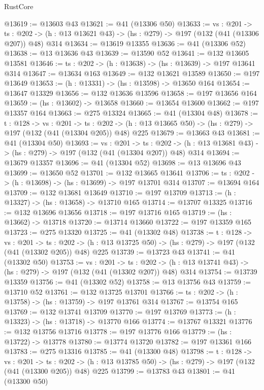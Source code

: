 \begin{lexlean}{RustCore}
\begin{coremodule}
@13619 := @13603 @43
@13621 := @41 (@13306 @50)
@13633 := {vs : @201} ->
  {ts : @202} -> (h : @13 @13621 @43) -> (hs : @279) -> @197 (@132 (@41 (@13306 @207)) @48) @314
@13634 := @13619 @13355
@13636 := @41 (@13306 @52)
@13638 := @13 @13636 @43
@13639 := @13590 @52
@13641 := @132 @13605 @13581
@13646 := {ts : @202} -> (h : @13638) -> (hs : @13639) -> @197 @13641 @314
@13647 := @13634 @163
@13649 := @132 @13621 @13589
@13650 := @197 @13649
@13653 := (h : @13331) -> (hs : @13598) -> @13650 @164
@13654 := @13647 @13329
@13656 := @132 @13636 @13596
@13658 := @197 @13656 @164
@13659 := (hs : @13602) -> @13658
@13660 := @13654 @13600
@13662 := @197 @13357 @164
@13663 := @275 @13324
@13665 := @41 (@13304 @48)
@13678 := {t : @128} ->
  {vs : @201} ->
  {ts : @202} -> (h : @13 @13665 @50) -> (hs : @279) -> @197 (@132 (@41 (@13304 @205)) @48) @225
@13679 := @13663 @43
@13681 := @41 (@13304 @50)
@13693 := {vs : @201} ->
  {ts : @202} -> (h : @13 @13681 @43) -> (hs : @279) -> @197 (@132 (@41 (@13304 @207)) @48) @314
@13694 := @13679 @13357
@13696 := @41 (@13304 @52)
@13698 := @13 @13696 @43
@13699 := @13650 @52
@13701 := @132 @13665 @13641
@13706 := {ts : @202} -> (h : @13698) -> (hs : @13699) -> @197 @13701 @314
@13707 := @13694 @164
@13709 := @132 @13681 @13649
@13710 := @197 @13709
@13713 := (h : @13327) -> (hs : @13658) -> @13710 @165
@13714 := @13707 @13325
@13716 := @132 @13696 @13656
@13718 := @197 @13716 @165
@13719 := (hs : @13662) -> @13718
@13720 := @13714 @13660
@13722 := @197 @13359 @165
@13723 := @275 @13320
@13725 := @41 (@13302 @48)
@13738 := {t : @128} ->
  {vs : @201} ->
  {ts : @202} -> (h : @13 @13725 @50) -> (hs : @279) -> @197 (@132 (@41 (@13302 @205)) @48) @225
@13739 := @13723 @43
@13741 := @41 (@13302 @50)
@13753 := {vs : @201} ->
  {ts : @202} -> (h : @13 @13741 @43) -> (hs : @279) -> @197 (@132 (@41 (@13302 @207)) @48) @314
@13754 := @13739 @13359
@13756 := @41 (@13302 @52)
@13758 := @13 @13756 @43
@13759 := @13710 @52
@13761 := @132 @13725 @13701
@13766 := {ts : @202} -> (h : @13758) -> (hs : @13759) -> @197 @13761 @314
@13767 := @13754 @165
@13769 := @132 @13741 @13709
@13770 := @197 @13769
@13773 := (h : @13323) -> (hs : @13718) -> @13770 @166
@13774 := @13767 @13321
@13776 := @132 @13756 @13716
@13778 := @197 @13776 @166
@13779 := (hs : @13722) -> @13778
@13780 := @13774 @13720
@13782 := @197 @13361 @166
@13783 := @275 @13316
@13785 := @41 (@13300 @48)
@13798 := {t : @128} ->
  {vs : @201} ->
  {ts : @202} -> (h : @13 @13785 @50) -> (hs : @279) -> @197 (@132 (@41 (@13300 @205)) @48) @225
@13799 := @13783 @43
@13801 := @41 (@13300 @50)

\end{coremodule}
\end{lexlean}
